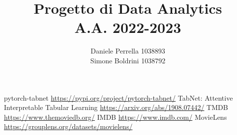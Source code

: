 \documentclass[12pt, a4paper]{report}
\author{Daniele Perrella 1038893\\
Simone Boldrini 1038792\\}
\title{Progetto di Data Analytics\\
A.A. 2022-2023}
\begin{document}
\maketitle
\tableofcontents







\newpage
\begin{thebibliography}{}
     pytorch-tabnet
    \newline\url{https://pypi.org/project/pytorch-tabnet/}
     TabNet: Attentive Interpretable Tabular Learning
    \newline\url{https://arxiv.org/abs/1908.07442/}
     TMDB
    \newline\url{https://www.themoviedb.org/}
     IMDB
    \newline\url{https://www.imdb.com/}
     MovieLens
    \newline\url{https://grouplens.org/datasets/movielens/}
\end{thebibliography}
\end{document}
